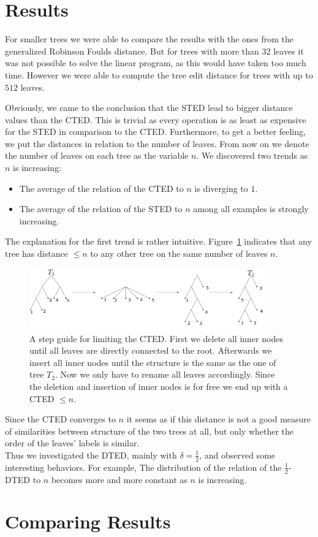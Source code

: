 \section{Results}
For smaller trees we were able to compare the results with the ones from the generalized Robinson Foulds distance. But for trees with more than $32$ leaves it was not possible to solve the linear program, as this would have taken too much time. However we were able to compute the tree edit distance for trees with up to $512$ leaves. 

Obviously, we came to the conclusion that the STED lead to bigger distance values than the CTED. This is trivial as every operation is as least as expensive for the STED in comparison to the CTED. Furthermore, to get a better feeling, we put the distances in relation to the number of leaves. From now on we denote the number of leaves on each tree as the variable $n$. We discovered two trends as $n$ is increasing:
\begin{itemize}
\item The average of the relation of the CTED to $n$ is diverging to $1$.
\item The average of the relation of the STED to $n$ among all examples is strongly increasing.
\end{itemize}
The explanation for the first trend is rather intuitive. Figure~\ref{fig:CTED} indicates that any tree has distance $\leq n$ to any other tree on the same number of leaves $n$.
\begin{figure}[!h]
    \centering
        \includegraphics[width=0.90\textwidth]{figures/CTED.png}
        \caption{A step guide for limiting the CTED. First we delete all inner nodes until all leaves are directly connected to the root. Afterwards we insert all inner nodes until the structure is the same as the one of tree $T_2$. Now we only have to rename all leaves accordingly. Since the deletion and insertion of inner nodes is for free we end up with a CTED $\leq n$.}
        \label{fig:CTED}
\end{figure}
Since the CTED converges to $n$ it seems as if this distance is not a good measure of similarities between structure of the two trees at all, but only whether the order of the leaves' labels is similar.\\
Thus we investigated the DTED, mainly with $\delta = \frac{1}{2}$, and observed some interesting behaviors. For example, The distribution of the relation of the $\frac{1}{2}$-DTED to $n$ becomes more and more constant as $n$ is increasing. 


\section{Comparing Results}
